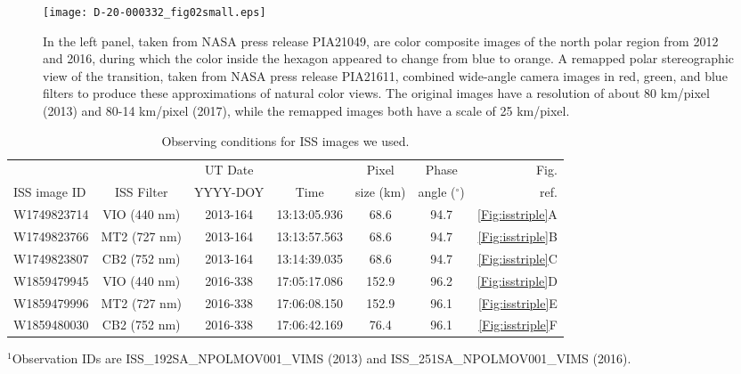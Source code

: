 \documentclass[article,11pt]{emulateapj}
\def\degx{$^\circ$}
\def\mumx{$\mu$m}
\begin{document}
\begin{figure*}[!t]\centering
\texttt{[image: D-20-000332\_fig02small.eps]}
\caption{In the left panel, taken from NASA press release PIA21049, are color 
composite images of the north polar region from 2012 and 2016, during which 
the color inside the hexagon appeared to change from blue to orange.  
A remapped polar stereographic view of the transition, taken from NASA press 
release PIA21611, combined wide-angle camera images in red, green, and
blue filters to produce these approximations of natural color views. 
The original images have a resolution of about 80 km/pixel (2013) and
 80-14 km/pixel (2017), while the remapped images both
have a scale of 25 km/pixel. }
\label{Fig:issevol}
\end{figure*}


\begin{table*}[!htb]\centering
\caption{Observing conditions for ISS images we used.}
\vspace{0.1in}
\setlength\tabcolsep{3pt}
\begin{tabular}{ l c c c c c r}
               &                   &   UT Date    &          &  Pixel & Phase & Fig.\\%
ISS image ID   &  ISS Filter       &  YYYY-DOY  &  Time    &  size (km)  & angle (\degx) & ref.    \\
\hline
  W1749823714 &  VIO (440 nm)    &  2013-164   &  13:13:05.936  &  68.6   &  94.7  &\ref{Fig:isstriple}A \\
  W1749823766 &  MT2 (727 nm)    &  2013-164   &  13:13:57.563  &  68.6   &  94.7  &\ref{Fig:isstriple}B \\
  W1749823807 &  CB2 (752 nm)    &  2013-164   &  13:14:39.035  &  68.6   &  94.7  &\ref{Fig:isstriple}C \\
  W1859479945 &  VIO (440 nm)    &  2016-338   &  17:05:17.086  & 152.9   &  96.2  &\ref{Fig:isstriple}D \\
  W1859479996 &  MT2 (727 nm)    &  2016-338   &  17:06:08.150  & 152.9   &  96.1  &\ref{Fig:isstriple}E \\
  W1859480030 &  CB2 (752 nm)    &  2016-338   &  17:06:42.169  &  76.4  &   96.1  &\ref{Fig:isstriple}F \\
\hline
\end{tabular}\label{Tbl:obslist1}
\parbox{5in}{$^1$Observation IDs are ISS\_192SA\_NPOLMOV001\_VIMS (2013) and ISS\_251SA\_NPOLMOV001\_VIMS (2016). \par
}
\end{table*}
\end{document}
